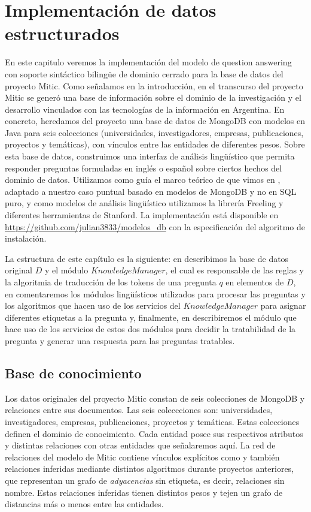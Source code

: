 \chapter{Implementación de datos estructurados}
\label{chap:4}
\horrible
En este capitulo veremos la implementación del modelo de question answering con soporte sintáctico bilingüe de dominio cerrado para la base de datos del proyecto Mitic. Como señalamos en la introducción, en el transcurso del proyecto Mitic se generó una base de información sobre el dominio de la investigación y el desarrollo vinculados con las tecnologías de la información en Argentina. En concreto, heredamos del proyecto una base de datos de MongoDB con modelos en Java para seis colecciones (universidades, investigadores, empresas, publicaciones, proyectos y temáticas), con vínculos entre las entidades de diferentes pesos. Sobre esta base de datos, construimos una interfaz de análisis lingüístico que permita responder preguntas formuladas en inglés o español sobre ciertos hechos del dominio de datos. Utilizamos como guía el marco teórico de \cite{QADB1} que vimos en , adaptado a nuestro caso puntual basado en modelos de MongoDB y no en SQL puro, y como modelos de análisis lingüístico utilizamos la librería Freeling y diferentes herramientas de Stanford. La implementación está disponible en \url{https://github.com/julian3833/modelos_db} con la especificación del algoritmo de instalación. 

La estructura de este capítulo es la siguiente: en  describimos la base de datos original $D$ y el módulo $KnowledgeManager$, el cual es responsable de las reglas y la algoritmia de traducción de los tokens de una pregunta $q$ en elementos de $D$, en  comentaremos los módulos lingüísticos utilizados para procesar las preguntas y los algoritmos que hacen uso de los servicios del $KnowledgeManager$ para asignar diferentes etiquetas a la pregunta y, finalmente, en  describiremos el módulo que hace uso de los servicios de estos dos módulos para decidir la tratabilidad de la pregunta y generar una respuesta para las preguntas tratables.

\section{Base de conocimiento}
\label{sec:grafo-mitic}

Los datos originales del proyecto Mitic constan de seis colecciones de MongoDB y relaciones entre sus documentos. Las seis coleccciones son: universidades, investigadores, empresas, publicaciones, proyectos y temáticas. Estas colecciones definen el dominio de conocimiento. Cada entidad posee sus respectivos atributos y distintas relaciones con otras entidades que señalaremos aquí. La red de relaciones del modelo de Mitic contiene vínculos explícitos como  y también relaciones inferidas mediante distintos algoritmos durante proyectos anteriores, que representan un grafo de \textit{adyacencias} sin etiqueta, es decir, relaciones sin nombre. Estas relaciones inferidas tienen distintos pesos  y tejen un grafo de distancias más o menos  entre las entidades. 

